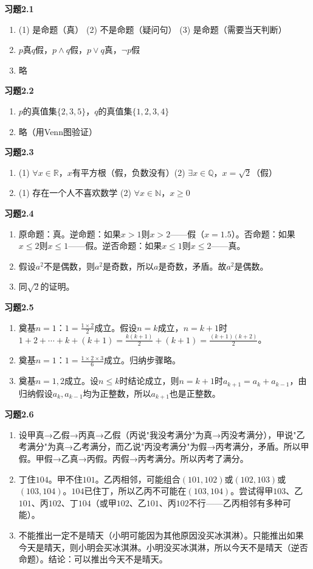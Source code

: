 
\textbf{习题2.1}
\begin{enumerate}
\item (1) 是命题（真） \qquad (2) 不是命题（疑问句） \qquad (3) 是命题（需要当天判断）
\item $p$真$q$假，$p\land q$假，$p\lor q$真，$\lnot p$假
\item 略
\end{enumerate}

\textbf{习题2.2}
\begin{enumerate}
\item $p$的真值集$\{2,3,5\}$，$q$的真值集$\{1,2,3,4\}$
\item 略（用Venn图验证）
\end{enumerate}

\textbf{习题2.3}
\begin{enumerate}
\item (1) $\forall x\in\mathbb R$，$x$有平方根（假，负数没有）\qquad (2) $\exists x\in\mathbb Q$，$x=\sqrt2$（假）
\item (1) 存在一个人不喜欢数学 \qquad (2) $\forall x\in\mathbb N$，$x\ge0$
\end{enumerate}

\textbf{习题2.4}
\begin{enumerate}
\item 原命题：真。逆命题：如果$x>1$则$x>2$——假（$x=1.5$）。否命题：如果$x\le2$则$x\le1$——假。逆否命题：如果$x\le1$则$x\le2$——真。
\item 假设$a^2$不是偶数，则$a^2$是奇数，所以$a$是奇数，矛盾。故$a^2$是偶数。
\item 同$\sqrt2$的证明。
\end{enumerate}

\textbf{习题2.5}
\begin{enumerate}
\item 奠基$n=1$：$1=\frac{1\times2}{2}$成立。假设$n=k$成立，$n=k+1$时$1+2+\cdots+k+(k+1)=\frac{k(k+1)}{2}+(k+1)=\frac{(k+1)(k+2)}{2}$。
\item 奠基$n=1$：$1=\frac{1\times2\times3}{6}$成立。归纳步骤略。
\item 奠基$n=1,2$成立。设$n\le k$时结论成立，则$n=k+1$时$a_{k+1}=a_k+a_{k-1}$，由归纳假设$a_k,a_{k-1}$均为正整数，所以$a_{k+1}$也是正整数。
\end{enumerate}

\textbf{习题2.6}
\begin{enumerate}
\item 设甲真→乙假→丙真→乙假（丙说"我没考满分"为真→丙没考满分），甲说"乙考满分"为真→乙考满分，而乙说"丙没考满分"为假→丙考满分，矛盾。所以甲假。甲假→乙真→丙假。丙假→丙考满分。所以丙考了满分。
\item 丁住$104$。甲不住$101$。乙丙相邻，可能组合$(101,102)$或$(102,103)$或$(103,104)$。$104$已住丁，所以乙丙不可能在$(103,104)$。尝试得甲$103$、乙$101$、丙$102$、丁$104$（或甲$102$、乙$101$、丙$102$不行——乙丙相邻有多种可能）。
\item 不能推出一定不是晴天（小明可能因为其他原因没买冰淇淋）。只能推出如果今天是晴天，则小明会买冰淇淋。小明没买冰淇淋，所以今天不是晴天（逆否命题）。结论：可以推出今天不是晴天。
\end{enumerate}

